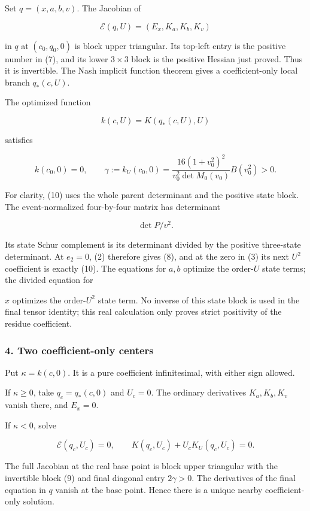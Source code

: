 Set \(q=(x,a,b,v)\). The Jacobian of

\[
\mathcal E(q,U)=(E_x,K_a,K_b,K_v)
\tag{9}
\]

in \(q\) at \((c_0,q_0,0)\) is block upper triangular. Its top-left entry is
the positive number in (7), and its lower \(3\times3\) block is the positive
Hessian just proved. Thus it is invertible. The Nash implicit function
theorem gives a coefficient-only local branch \(q_*(c,U)\).

The optimized function

\[
k(c,U)=K(q_*(c,U),U)
\]

satisfies

\[
k(c_0,0)=0,\qquad
\gamma:=k_U(c_0,0)
=\frac{16(1+v_0^2)^2}{v_0^2\det M_0(v_0)}B(v_0^2)>0.
\tag{10}
\]

For clarity, (10) uses the whole parent determinant and the positive state
block. The event-normalized four-by-four matrix has determinant

\[
\det P/v^2.
\]

Its state Schur complement is its determinant divided by the positive
three-state determinant. At \(e_2=0\), (2) therefore gives (8), and at the
zero in (3) its next \(U^2\) coefficient is exactly (10). The equations
for \(a,b\) optimize the order-\(U\) state terms; the divided equation for

\(x\) optimizes the order-\(U^2\) state term. No inverse of this state block
is used in the final tensor identity; this real calculation only proves
strict positivity of the residue coefficient.

\hypertarget{two-coefficient-only-centers}{%
\subsubsection*{4. Two coefficient-only centers}\label{p4ec1a51262f9:two-coefficient-only-centers}}

Put \(\kappa=k(c,0)\). It is a pure coefficient infinitesimal, with either
sign allowed.

If \(\kappa\ge0\), take \(q_c=q_*(c,0)\) and \(U_c=0\). The ordinary
derivatives \(K_a,K_b,K_v\) vanish there, and \(E_x=0\).

If \(\kappa<0\), solve

\[
\mathcal E(q_c,U_c)=0,\qquad
K(q_c,U_c)+U_cK_U(q_c,U_c)=0.
\tag{11}
\]

The full Jacobian at the real base point is block upper triangular with
the invertible block (9) and final diagonal entry \(2\gamma>0\). The
derivatives of the final equation in \(q\) vanish at the base point.
Hence there is a unique nearby coefficient-only solution.

